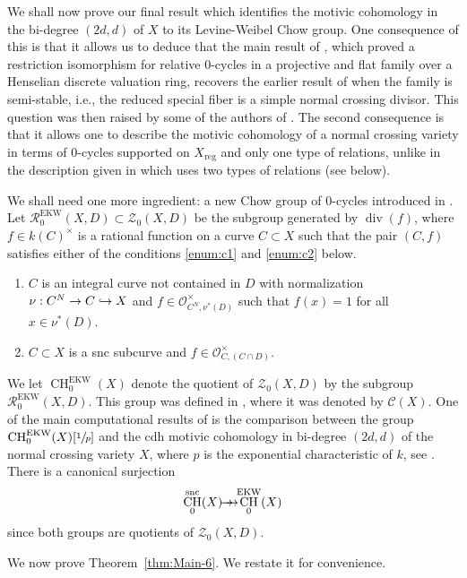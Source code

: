 \documentclass[JEP,XML,SOM,Unicode,published]{cedram}
\let\mathcal\mathscr
\def\hto{\mathrel{\lhook\joinrel\to}}
\newcommand{\onto}{\mathchoice{\to\hspace*{-5mm}\to}{\hspace*{-.5mm}\to\hspace*{-2.85mm}\to\hspace*{-.5mm}}{\to\hspace*{-3mm}\to}{\to\hspace*{-3mm}\to}}
\let\surj\onto
\let\inj\hto
\newcommand{\snc}{\mathrm{snc}}
\newcommand{\EKW}{\mathrm{EKW}}
\theoremstyle{definition}
\newcommand{\thmref}{Theorem~\ref}
\newcommand{\sC}{{\mathcal C}}
\newcommand{\sO}{{\mathcal O}}\let\cO\sO
\newcommand{\sR}{{\mathcal R}}
\newcommand{\sZ}{{\mathcal Z}}
\DeclareMathOperator{\CH}{CH}
\DeclareMathOperator{\divf}{div}
\newcommand{\reg}{\mathrm{reg}}
\begin{document}
We shall now prove our final result which identifies the
motivic cohomology in the bi-degree $(2d,d)$ of $X$ to its Levine-Weibel Chow
group. One consequence of this is that it allows us to deduce that the
main result of \cite{BKres}, which proved a restriction isomorphism for
relative $0$-cycles in a projective and flat family over a Henselian
discrete valuation
ring, recovers the earlier result of \cite{EKW} when the family is semi-stable,
i.e., the reduced special fiber is a simple normal crossing divisor.
This question was then raised by some of the authors of \cite{EKW}.
The second consequence is that it allows one to describe the
motivic cohomology of a normal crossing variety in terms of $0$-cycles
supported on $X_\reg$ and only one type of relations, unlike in the
description given in \cite{EKW} which uses two types of relations
(see below).

We shall need one more ingredient: a new Chow group of $0$-cycles
introduced in \cite[\S2]{EKW}.
Let $\sR^{\EKW}_0(X,D) \subset \sZ_0(X,D)$ be the subgroup generated
by $\divf(f)$, where $f \in k(C)^{\times}$ is a rational function on a curve
$C \subset X$ such that the pair $(C,f)$ satisfies either of the conditions
\eqref{enum:c1} and \eqref{enum:c2} below.
\begin{enumerate}
\item\label{enum:c1}
$C$ is an integral curve not contained in $D$ with normalization
$\nu: C^N \to C \inj X$ and $f \in \sO^{\times}_{C^N, \nu^*(D)}$ such that
$f(x) = 1$ for all $x \in \nu^*(D)$.
\item\label{enum:c2}
$C \subset X$ is a snc subcurve and
$f \in \sO^{\times}_{C, (C\cap D)}$.
\end{enumerate}

We let $\CH^{\EKW}_0(X)$ denote the quotient of $\sZ_0(X,D)$ by the subgroup
$\sR^{\EKW}_0(X,D)$. This group was defined in \cite[\S2]{EKW}, where
it was denoted by $\sC(X)$. One of the main computational results of
\cite{EKW} is the comparison between the group $\CH^{\EKW}_0(X)[\sfrac{1}{p}]$ and
the cdh motivic cohomology in bi-degree $(2d,d)$ of the normal crossing variety
$X$, where $p$ is the exponential characteristic of $k$, see \cite[Th.\,7.1]{EKW}.
There is a canonical surjection
\begin{equation}\label{eqn:surjSNC-EKW}
\CH_0^{\snc}(X) \surj \CH_0^{\EKW}(X)
\end{equation}
since both groups are quotients of $\sZ_0(X,D)$.

We now prove \thmref{thm:Main-6}. We restate it for convenience.
\end{document}
